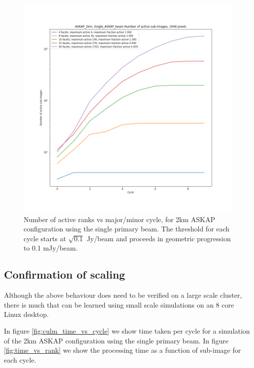 \documentclass[11pt,a4paper,variablewidth]{article}
\begin{document}
\begin{figure}[h]
  \centering
  \includegraphics[width=\textwidth]{./pngs/number_active_Single_ASKAP_beam_ASKAP_2km_2048.png}
  \caption{Number of active ranks vs major/minor cycle, for 2km ASKAP configuration using the single primary beam. The threshold for each cycle starts at $\sqrt{0.1}$ Jy/beam and proceeds in geometric progression to 0.1 mJy/beam.}
  \label{fig:number_active_ASKAP_2km}
\end{figure}

\subsection{Confirmation of scaling}

Although the above behaviour does need to be verified on a large scale cluster, there is much that can be learned using small scale simulations on an 8 core Linux desktop.

In figure \ref{fig:culm_time_vs_cycle} we show time taken per cycle for a simulation of the 2km ASKAP configuration using the single primary beam. In figure \ref{fig:time_vs_rank} we show the processing time as a function of sub-image for each cycle.
\end{document}

